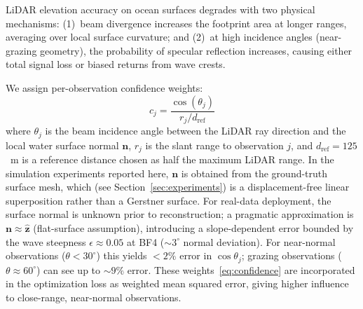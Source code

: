 \documentclass[review]{elsarticle}
\begin{document}
LiDAR elevation accuracy on ocean surfaces degrades with two
physical mechanisms:
(1)~beam divergence increases the footprint area at longer ranges,
averaging over local surface curvature; and
(2)~at high incidence angles (near-grazing geometry), the probability
of specular reflection increases, causing either total signal loss
or biased returns from wave crests.

We assign per-observation confidence weights:
\begin{equation}
  c_j = \frac{\cos(\theta_j)}{r_j / d_{\text{ref}}}
  \label{eq:confidence}
\end{equation}
where $\theta_j$ is the beam incidence angle between the LiDAR ray
direction and the local water surface normal $\mathbf{n}$, $r_j$ is
the slant range to observation $j$, and $d_{\text{ref}} = 125$~m is a reference distance chosen
as half the maximum LiDAR range.
In the simulation experiments reported here, $\mathbf{n}$ is obtained
from the ground-truth surface mesh, which (see
Section~\ref{sec:experiments}) is a displacement-free linear
superposition rather than a Gerstner surface.  For real-data deployment,
the surface normal is unknown prior to reconstruction; a pragmatic
approximation is $\mathbf{n} \approx \hat{\mathbf{z}}$ (flat-surface
assumption), introducing a slope-dependent error bounded by the wave
steepness $\epsilon \approx 0.05$ at BF4 (${\sim}3^\circ$ normal
deviation). For near-normal observations ($\theta < 30^\circ$) this
yields $<2\%$ error in $\cos\theta_j$; grazing observations
($\theta \approx 60^\circ$) can see up to ${\sim}9\%$ error.
These weights~\eqref{eq:confidence} are incorporated in the optimization loss as weighted
mean squared error, giving higher influence to close-range,
near-normal observations.
\end{document}
